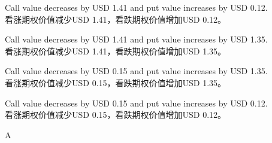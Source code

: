 \documentclass{article}
\begin{document}
\begin{choices}
    \item Call value decreases by USD 1.41 and put value increases by USD 0.12. \\
    看涨期权价值减少USD 1.41，看跌期权价值增加USD 0.12。
    \item Call value decreases by USD 1.41 and put value increases by USD 1.35.\\
    看涨期权价值减少USD 1.41，看跌期权价值增加USD 1.35。
    \item Call value decreases by USD 0.15 and put value increases by USD 1.35.\\
    看涨期权价值减少USD 0.15，看跌期权价值增加USD 1.35。
    \item Call value decreases by USD 0.15 and put value increases by USD 0.12.\\
    看涨期权价值减少USD 0.15，看跌期权价值增加USD 0.12。
\end{choices}

\begin{correctanswer}
    A
\end{correctanswer}
\end{document}
